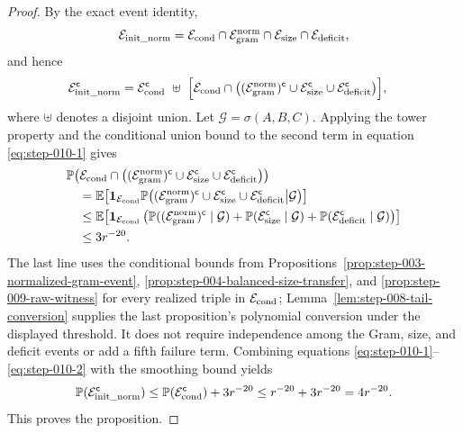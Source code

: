 \begin{proof}
By the exact event identity,
\[
  \mathcal E_{\rm init\_norm}
  =\mathcal E_{\rm cond}\cap\mathcal E_{\rm gram}^{\rm norm}
   \cap\mathcal E_{\rm size}\cap\mathcal E_{\rm deficit},
\]
and hence
\begin{equation}
\begin{aligned}
  \mathcal E_{\rm init\_norm}^{\mathsf c}
  ={}&\mathcal E_{\rm cond}^{\mathsf c}\ \uplus\
  \Bigl[\mathcal E_{\rm cond}\cap
    \bigl((\mathcal E_{\rm gram}^{\rm norm})^{\mathsf c}
      \cup\mathcal E_{\rm size}^{\mathsf c}
      \cup\mathcal E_{\rm deficit}^{\mathsf c}\bigr)\Bigr],
\end{aligned}                                               \label{eq:step-010-1}
\end{equation}
where \(\uplus\) denotes a disjoint union. Let
\(\mathcal G=\sigma(A,B,C)\). Applying the tower property and the
conditional union bound to the second term in equation \eqref{eq:step-010-1} gives
\begin{equation}
\begin{aligned}
&\mathbb P\!\left(\mathcal E_{\rm cond}\cap
    \bigl((\mathcal E_{\rm gram}^{\rm norm})^{\mathsf c}
      \cup\mathcal E_{\rm size}^{\mathsf c}
      \cup\mathcal E_{\rm deficit}^{\mathsf c}\bigr)\right)\\
&\quad=\mathbb E\!\left[\mathbf 1_{\mathcal E_{\rm cond}}
  \mathbb P\!\left(
    (\mathcal E_{\rm gram}^{\rm norm})^{\mathsf c}
      \cup\mathcal E_{\rm size}^{\mathsf c}
      \cup\mathcal E_{\rm deficit}^{\mathsf c}
      \middle|\mathcal G\right)\right]\\
&\quad\le\mathbb E\!\left[\mathbf 1_{\mathcal E_{\rm cond}}
  \left(
    \mathbb P((\mathcal E_{\rm gram}^{\rm norm})^{\mathsf c}
      \mid\mathcal G)
    +\mathbb P(\mathcal E_{\rm size}^{\mathsf c}\mid\mathcal G)
    +\mathbb P(\mathcal E_{\rm deficit}^{\mathsf c}\mid\mathcal G)
  \right)\right]\\
&\quad\le 3r^{-20}.
\end{aligned}\label{eq:step-010-2}
\end{equation}
The last line uses the conditional bounds from
Propositions~\ref{prop:step-003-normalized-gram-event},
\ref{prop:step-004-balanced-size-transfer}, and
\ref{prop:step-009-raw-witness} for every realized triple in
\(\mathcal E_{\rm cond}\); Lemma~\ref{lem:step-008-tail-conversion}
supplies the last proposition's polynomial conversion under the displayed
threshold. It does not require independence among the Gram, size, and deficit
events or add a fifth failure term. Combining equations
\eqref{eq:step-010-1}--\eqref{eq:step-010-2} with the
smoothing bound yields
\[
  \mathbb P(\mathcal E_{\rm init\_norm}^{\mathsf c})
  \le \mathbb P(\mathcal E_{\rm cond}^{\mathsf c})+3r^{-20}
  \le r^{-20}+3r^{-20}=4r^{-20}.
\]
This proves the proposition. 

\end{proof}


